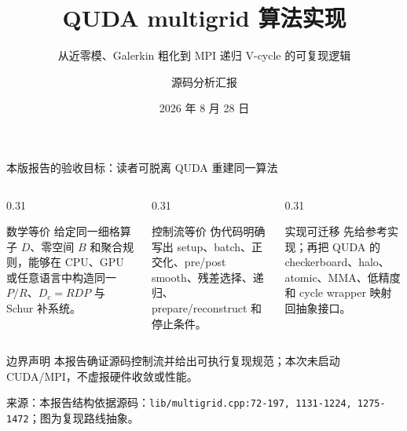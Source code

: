 \documentclass[UTF8,aspectratio=169,11pt]{ctexbeamer}
\title[QUDA multigrid 复现手册]{QUDA multigrid 算法实现}
\subtitle{从近零模、Galerkin 粗化到 MPI 递归 V-cycle 的可复现逻辑}
\author[源码分析汇报]{源码分析汇报}
\institute{QUDA 1.1.0 参考源码快照}
\date{2026 年 8 月 28 日}
\newcommand{\source}[1]{\vspace{0.05em}\par{\raggedright\scriptsize\color{muted}来源：#1\par}}
\newcommand{\codepath}[1]{\nolinkurl{#1}}
\begin{document}
\begin{frame}[plain]
  \titlepage
\end{frame}

\begin{frame}[t]{本版报告的验收目标：读者可脱离 QUDA 重建同一算法}
  \small
  \begin{columns}[T,totalwidth=\textwidth]
    \begin{column}{0.31\textwidth}
      \begin{block}{数学等价}
        给定同一细格算子 \(D\)、零空间 \(B\) 和聚合规则，能够在 CPU、GPU 或任意语言中构造同一 \(P/R\)、\(D_c=RDP\) 与 Schur 补系统。
      \end{block}
    \end{column}
    \begin{column}{0.31\textwidth}
      \begin{block}{控制流等价}
        伪代码明确写出 setup、batch、正交化、pre/post smooth、残差选择、递归、prepare/reconstruct 和停止条件。
      \end{block}
    \end{column}
    \begin{column}{0.31\textwidth}
      \begin{block}{实现可迁移}
        先给参考实现；再把 QUDA 的 checkerboard、halo、atomic、MMA、低精度和 cycle wrapper 映射回抽象接口。
      \end{block}
    \end{column}
  \end{columns}
  \vspace{0.08cm}
  \begin{alertblock}{边界声明}
    本报告确证源码控制流并给出可执行复现规范；本次未启动 CUDA/MPI，不虚报硬件收敛或性能。
  \end{alertblock}
  \vfill
  \begin{center}
  \end{center}
  \source{本报告结构依据源码：\codepath{lib/multigrid.cpp:72-197, 1131-1224, 1275-1472}；图为复现路线抽象。}
\end{frame}
\end{document}
